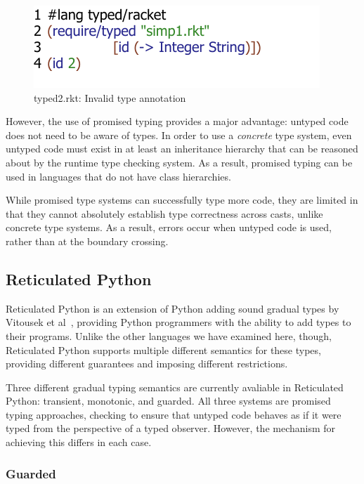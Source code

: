 \documentclass[a4paper,USenglish]{tex/lipics-v2016}
\begin{document}
\begin{figure}[h]
\includegraphics{figures/typed-rkt2.pdf}
\caption{typed2.rkt: Invalid type annotation}
\label{fig:tr2}
\end{figure}

However, the use of promised typing provides a major advantage: untyped code
does not need to be aware of types. In order to use a \emph{concrete} type
system, even untyped code must exist in at least an inheritance hierarchy
that can be reasoned about by the runtime type checking system. As a result,
promised typing can be used in languages that do not have class hierarchies.

While promised type systems can successfully type more code, they are
limited in that they cannot absolutely establish type correctness across
casts, unlike concrete type systems. As a result, errors occur when untyped
code is used, rather than at the boundary crossing.

\subsection{Reticulated Python}

Reticulated Python is an extension of Python adding sound gradual types by
Vitousek et al~\cite{designeval-python}, providing Python programmers with
the ability to add types to their programs. Unlike the other languages we
have examined here, though, Reticulated Python supports multiple different
semantics for these types, providing different guarantees and imposing
different restrictions.

Three different gradual typing semantics are currently avaliable in
Reticulated Python: transient, monotonic, and guarded. All three systems are
promised typing approaches, checking to ensure that untyped code behaves as
if it were typed from the perspective of a typed observer. However, the
mechanism for achieving this differs in each case.

\subsubsection{Guarded}
\end{document}
